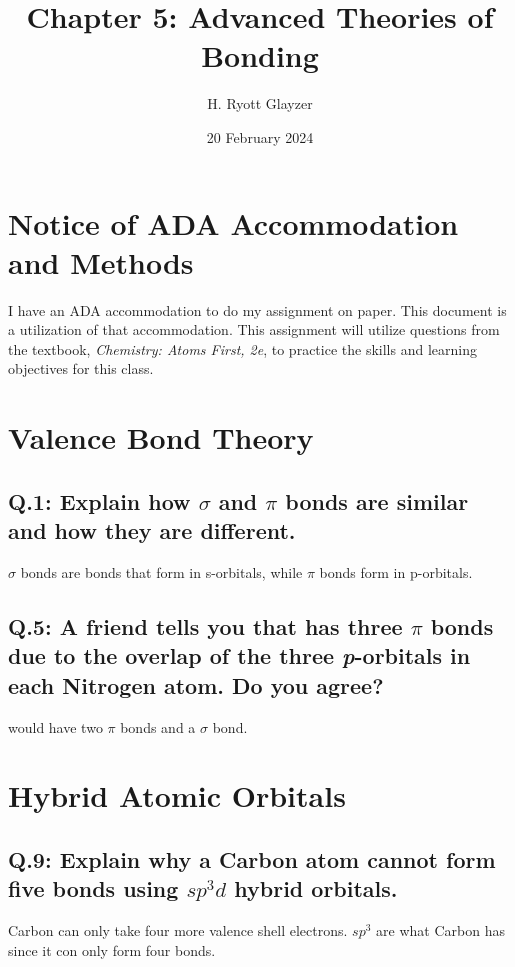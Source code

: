 \documentclass[10pt, letterpaper]{article}
\begin{document}


\title{Chapter 5: Advanced Theories of Bonding}
\author{H. Ryott Glayzer}
\date{20 February 2024}


\maketitle


\section*{Notice of ADA Accommodation and Methods}
I have an ADA accommodation to do my assignment on paper.
This document is a utilization of that accommodation.
This assignment will utilize questions from the textbook,
\textit{Chemistry: Atoms First, 2e}, to practice the skills
and learning objectives for this class.

\section{Valence Bond Theory}

\subsection*{Q.1: Explain how $\sigma$ and $\pi$ bonds are similar and how they are different.}
$\sigma$ bonds are bonds that form in s-orbitals, while $\pi$ bonds form in p-orbitals.

\subsection*{Q.5: A friend tells you that  has three $\pi$ bonds due to the
overlap of the three \textit{p}-orbitals in each Nitrogen atom. Do you agree?}
 would have two $\pi$ bonds and a $\sigma$ bond.

\section{Hybrid Atomic Orbitals}

\subsection*{Q.9: Explain why a Carbon atom cannot form five bonds using $sp^{3}d$
hybrid orbitals.}
Carbon can only take four more valence shell electrons. 
$sp^{3}$ are what Carbon has since it con only form four bonds.
\end{document}
